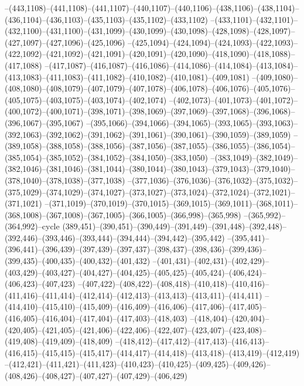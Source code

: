 --(443,1108)--(441,1108)--(441,1107)--(440,1107)--(440,1106)--(438,1106)--(438,1104)--(436,1104)--(436,1103)--(435,1103)--(435,1102)--(433,1102)
--(433,1101)--(432,1101)--(432,1100)--(431,1100)--(431,1099)--(430,1099)--(430,1098)--(428,1098)--(428,1097)--(427,1097)--(427,1096)--(425,1096)
--(425,1094)--(424,1094)--(424,1093)--(422,1093)--(422,1092)--(421,1092)--(421,1091)--(420,1091)--(420,1090)--(418,1090)--(418,1088)--(417,1088)
--(417,1087)--(416,1087)--(416,1086)--(414,1086)--(414,1084)--(413,1084)--(413,1083)--(411,1083)--(411,1082)--(410,1082)--(410,1081)--(409,1081)
--(409,1080)--(408,1080)--(408,1079)--(407,1079)--(407,1078)--(406,1078)--(406,1076)--(405,1076)--(405,1075)--(403,1075)--(403,1074)--(402,1074)
--(402,1073)--(401,1073)--(401,1072)--(400,1072)--(400,1071)--(398,1071)--(398,1069)--(397,1069)--(397,1068)--(396,1068)--(396,1067)--(395,1067)
--(395,1066)--(394,1066)--(394,1065)--(393,1065)--(393,1063)--(392,1063)--(392,1062)--(391,1062)--(391,1061)--(390,1061)--(390,1059)--(389,1059)
--(389,1058)--(388,1058)--(388,1056)--(387,1056)--(387,1055)--(386,1055)--(386,1054)--(385,1054)--(385,1052)--(384,1052)--(384,1050)--(383,1050)
--(383,1049)--(382,1049)--(382,1046)--(381,1046)--(381,1044)--(380,1044)--(380,1043)--(379,1043)--(379,1040)--(378,1040)--(378,1038)--(377,1038)
--(377,1036)--(376,1036)--(376,1032)--(375,1032)--(375,1029)--(374,1029)--(374,1027)--(373,1027)--(373,1024)--(372,1024)--(372,1021)--(371,1021)
--(371,1019)--(370,1019)--(370,1015)--(369,1015)--(369,1011)--(368,1011)--(368,1008)--(367,1008)--(367,1005)--(366,1005)--(366,998)--(365,998)
--(365,992)--(364,992)--cycle
(389,451)--(390,451)--(390,449)--(391,449)--(391,448)--(392,448)--(392,446)--(393,446)--(393,444)--(394,444)--(394,442)--(395,442)
--(395,441)--(396,441)--(396,439)--(397,439)--(397,437)--(398,437)--(398,436)--(399,436)--(399,435)--(400,435)--(400,432)--(401,432)
--(401,431)--(402,431)--(402,429)--(403,429)--(403,427)--(404,427)--(404,425)--(405,425)--(405,424)--(406,424)--(406,423)--(407,423)
--(407,422)--(408,422)--(408,418)--(410,418)--(410,416)--(411,416)--(411,414)--(412,414)--(412,413)--(413,413)--(413,411)--(414,411)
--(414,410)--(415,410)--(415,409)--(416,409)--(416,406)--(417,406)--(417,405)--(416,405)--(416,404)--(417,404)--(417,403)--(418,403)
--(418,404)--(420,404)--(420,405)--(421,405)--(421,406)--(422,406)--(422,407)--(423,407)--(423,408)--(419,408)--(419,409)--(418,409)
--(418,412)--(417,412)--(417,413)--(416,413)--(416,415)--(415,415)--(415,417)--(414,417)--(414,418)--(413,418)--(413,419)--(412,419)
--(412,421)--(411,421)--(411,423)--(410,423)--(410,425)--(409,425)--(409,426)--(408,426)--(408,427)--(407,427)--(407,429)--(406,429)
